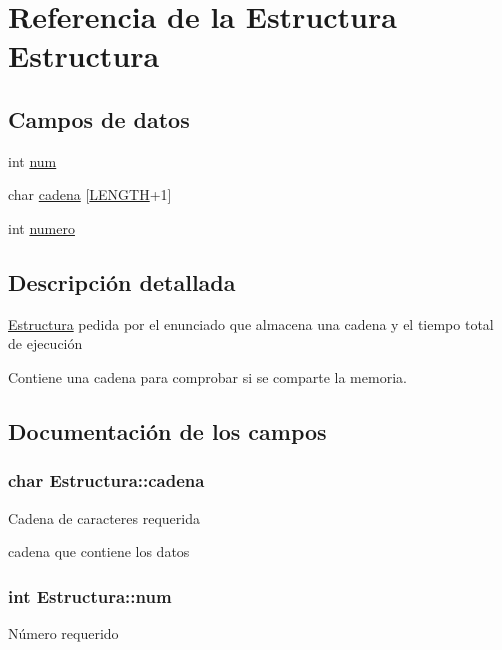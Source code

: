 \hypertarget{structEstructura}{\section{Referencia de la Estructura Estructura}
\label{structEstructura}
}
\subsection*{Campos de datos}
\begin{DoxyCompactItemize}
\item 
int \hyperlink{structEstructura_a285c7a878885df76016c7cf2ddc4f53f}{num}
\end{DoxyCompactItemize}
{\bf }\par
\begin{DoxyCompactItemize}
\item 
char \hyperlink{structEstructura_a71ac945c86172d84db00f84c1e451300}{cadena} \mbox{[}\hyperlink{ejercicio6_8c_a30362161c93e3f1a4ee4c673f535b5a8}{L\-E\-N\-G\-T\-H}+1\mbox{]}
\item 
int \hyperlink{structEstructura_aac88eb7b472875436ed5fdf0b84aa1c3}{numero}
\end{DoxyCompactItemize}



\subsection{Descripción detallada}
\hyperlink{structEstructura}{Estructura} pedida por el enunciado que almacena una cadena y el tiempo total de ejecución

Contiene una cadena para comprobar si se comparte la memoria. 

\subsection{Documentación de los campos}
\hypertarget{structEstructura_a71ac945c86172d84db00f84c1e451300}{
\subsubsection[{cadena}]{\setlength{\rightskip}{0pt plus 5cm}char Estructura\-::cadena}}\label{structEstructura_a71ac945c86172d84db00f84c1e451300}
Cadena de caracteres requerida

cadena que contiene los datos \hypertarget{structEstructura_a285c7a878885df76016c7cf2ddc4f53f}{
\subsubsection[{num}]{\setlength{\rightskip}{0pt plus 5cm}int Estructura\-::num}}\label{structEstructura_a285c7a878885df76016c7cf2ddc4f53f}
Número requerido

